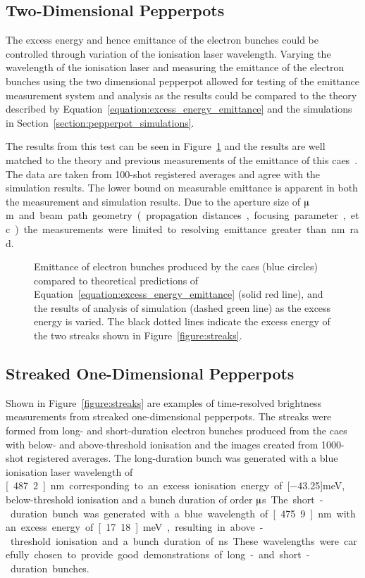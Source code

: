 \subsection{Two-Dimensional Pepperpots}
The excess energy and hence emittance of the electron bunches could be controlled through variation of the ionisation laser wavelength.
Varying the wavelength of the ionisation laser and measuring the emittance of the electron bunches using the two dimensional pepperpot allowed for testing of the emittance measurement system and analysis as the results could be compared to the theory described by Equation~\ref{equation:excess_energy_emittance} and the simulations in Section~\ref{section:pepperpot_simulations}.

The results from this test can be seen in Figure~\ref{figure:emittance_vs_theory} and the results are well matched to the theory and previous measurements of the emittance of this \gls{caes}~\cite{mcculloch_high-coherence_2013}.
The data are taken from 100-shot registered averages and agree with the simulation results.
The lower bound on measurable emittance is apparent in both the measurement and simulation results.
Due to the aperture size of \unit[50]{$\muup$m} and beam path geometry (propagation distances, focusing parameter, etc.) the measurements were limited to resolving emittance greater than \unit[41]{nm rad}.

\begin{figure}
    \center
    
    \caption[Measured emittance compared with theory and simulation.]{Emittance of electron bunches produced by the \gls{caes} (blue circles) compared to theoretical predictions of Equation~\ref{equation:excess_energy_emittance} (solid red line), and the results of analysis of simulation (dashed green line) as the excess energy is varied. The black dotted lines indicate the excess energy of the two streaks shown in Figure~\ref{figure:streaks}.}
    \label{figure:emittance_vs_theory}
\end{figure}


\subsection{Streaked One-Dimensional Pepperpots}\label{section:streaked_pepperpot_results}
Shown in Figure~\ref{figure:streaks} are examples of time-resolved brightness measurements from streaked one-dimensional pepperpots.
The streaks were formed from long- and short-duration electron bunches produced from the \gls{caes} with below- and above-threshold ionisation and the images created from 1000-shot registered averages.
The long-duration bunch was generated with a blue ionisation laser wavelength of \unit[487.2]{nm} corresponding to an excess ionisation energy of \unit[$-$43.25]{meV}, below-threshold ionisation and a bunch duration of order \unit[10]{$\muup$s}.
The short-duration bunch was generated with a blue wavelength of \unit[475.9]{nm} with an excess energy of \unit[17.18]{meV}, resulting in above-threshold ionisation and a bunch duration of \unit[5]{ns}.
These wavelengths were carefully chosen to provide good demonstrations of long- and short-duration bunches.

